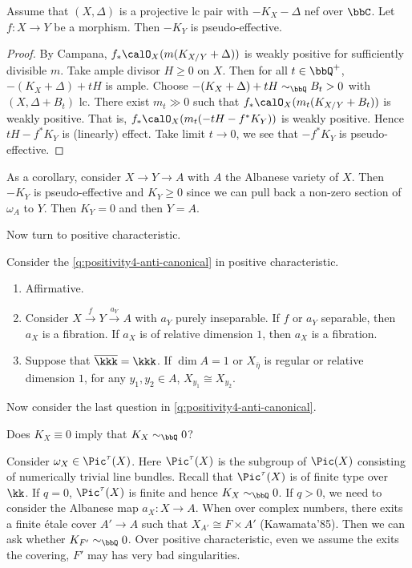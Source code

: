 \begin{theorem}
	Assume that $(X,\Delta)$ is a projective lc pair with $-K_X - \Delta$ nef over $\bbC$.
	Let $f: X \to Y$ be a morphism.
	Then $-K_Y$ is pseudo-effective.
\end{theorem}
\begin{proof}[Proof]
	By Campana, $f_*\calO_X(m(K_{X/Y} + \Delta))$ is weakly positive for sufficiently divisible $m$.
	Take ample divisor $H \geq 0$ on $X$.
	Then for all $t \in \bbQ^+$, $-(K_X + \Delta) + tH$ is ample.
	Choose $-(K_X + \Delta) + tH \sim_{\bbQ} B_t > 0$ with $(X, \Delta + B_t)$ lc.
	There exist $m_t \gg 0$ such that $f_*\calO_X(m_t(K_{X/Y} + B_t))$ is weakly positive.
	That is, $f_*\calO_X(m_t(-tH - f^*K_Y))$ is weakly positive.
	Hence $tH-f^*K_Y$ is (linearly) effect.
	Take limit $t \to 0$, we see that $-f^*K_Y$ is pseudo-effective.
\end{proof}

As a corollary, consider $X \to Y \to A$ with $A$ the Albanese variety of $X$.
Then $-K_Y$ is pseudo-effective and $K_Y \geq 0$ since we can pull back a non-zero section of $\omega_A$ to $Y$.
Then $K_Y = 0$ and then $Y = A$.

Now turn to positive characteristic.

\begin{theorem}
	Consider the \cref{q:positivity4-anti-canonical} in positive characteristic.
	\begin{enumerate}
		\item Affirmative.
		\item Consider $X \xrightarrow{f} Y \xrightarrow{a_Y} A$ with $a_Y$ purely inseparable.
		      If $f$ or $a_Y$ separable, then $a_X$ is a fibration.
		      If $a_X$ is of relative dimension $1$, then $a_X$ is a fibration.
		\item Suppose that $\overline{\kkk} = \kkk$.
		      If $\dim A = 1$ or $X_{\overline{\eta}}$ is regular or relative dimension $1$, for any $y_1,y_2 \in A$, $X_{y_1} \cong X_{y_2}$.
	\end{enumerate}
\end{theorem}

Now consider the last question in \cref{q:positivity4-anti-canonical}.

\begin{question}
	Does $K_X \equiv 0$ imply that $K_X \sim_{\bbQ} 0$?
\end{question}

Consider $\omega_X \in \Pic^\tau(X)$.
Here $\Pic^\tau(X)$ is the subgroup of $\Pic(X)$ consisting of numerically trivial line bundles.
Recall that $\Pic^\tau(X)$ is of finite type over $\kk$.
If $q = 0$, $\Pic^\tau(X)$ is finite and hence $K_X \sim_{\bbQ} 0$.
If $q > 0$, we need to consider the Albanese map $a_X: X \to A$.
When over complex numbers, there exits a finite étale cover $A' \to A$ such that $X_{A'} \cong F \times A'$ (Kawamata'85).
Then we can ask whether $K_{F'} \sim_{\bbQ} 0$.
Over positive characteristic, even we assume the exits the covering, $F'$ may has very bad singularities.

